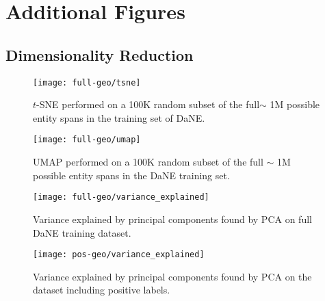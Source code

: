\documentclass[main.tex]{subfiles}
\begin{document}
\chapter{Additional Figures}
\section{Dimensionality Reduction}
\label{sec:dimredu}

\begin{figure}[H]
    \centering
        \texttt{[image: full-geo/tsne]}
    \caption{
        $t$-SNE performed on a 100K random subset of the full$\sim$ 1M possible entity spans in the training set of DaNE.
    }
    \label{fig:full-tsne}
\end{figure}\noindent

\begin{figure}[H]
    \centering
        \texttt{[image: full-geo/umap]}
    \caption{
        UMAP performed on a 100K random subset of the full $\sim$ 1M possible entity spans in the DaNE training set.
    }
    \label{fig:full-umap}
\end{figure}\noindent

\begin{figure}[H]
    \centering
        \texttt{[image: full-geo/variance\_explained]}
    \caption{
        Variance explained by principal components found by PCA on full DaNE training dataset.
    }
    \label{fig:full-varex}
\end{figure}\noindent

\begin{figure}[H]
    \centering
        \texttt{[image: pos-geo/variance\_explained]}
    \caption{
        Variance explained by principal components found by PCA on the dataset including positive labels.
    }
    \label{fig:pos-varex}
\end{figure}\noindent
\end{document}

